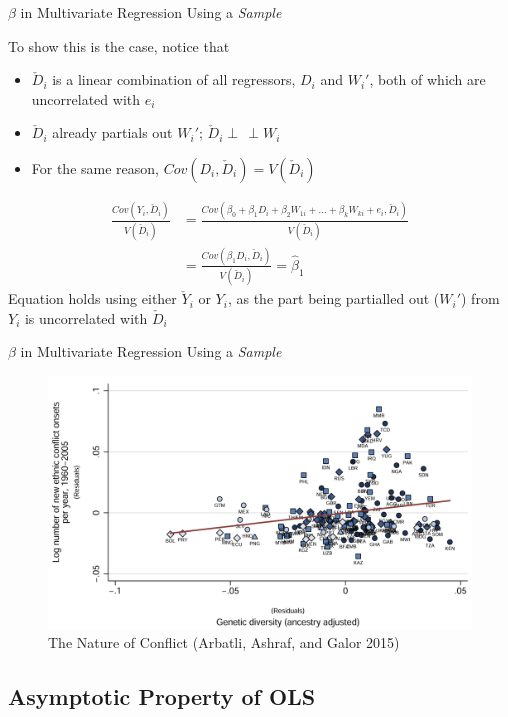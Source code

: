 \documentclass[aspectratio=1610,12pt,xcolor=dvipsnames]{beamer}
\newcommand{\indep}{\perp\!\!\!\, \perp}
\begin{document}
\begin{frame}{$\beta$ in Multivariate Regression Using a \textit{Sample}}

To show this is the case, notice that 
\begin{itemize}
    \item $\check{D}_i$ is a linear combination of all regressors, $D_i$ and $W_i'$, both of which are uncorrelated with $e_i$
    \item $\check{D}_i$ already partials out $W_i'$; $\check{D}_i \indep W_i$
    \item For the same reason, $Cov(D_i,\check{D}_i) = V(\check{D}_i)$
\end{itemize}
\begin{align*}
    \frac{Cov(Y_i,\check{D}_i)}{V(\check{D}_i)} &= \frac{Cov(\beta_0 + \beta_1 D_i + \beta_2 W_{1i} + ... + \beta_k W_{ki} + e_i,\check{D}_i)}{V(\check{D}_i)} \\
    &= \frac{Cov(\beta_1 D_i,\check{D}_i)}{V(\check{D}_i)}
    = \hat \beta_1
\end{align*}\pause
Equation holds using either $\check{Y}_i$ or $Y_i$, as the part being partialled out ($W_i'$) from $Y_i$ is uncorrelated with $\check{D}_i$
\end{frame}

\begin{frame}{$\beta$ in Multivariate Regression Using a \textit{Sample}}

    \begin{figure}
        \centering
        \includegraphics[width=0.75\linewidth]{./Figures/FWL_example.png}
        \caption{The Nature of Conflict (Arbatli, Ashraf, and Galor 2015)}
        \label{fig:placeholder}
    \end{figure}
\end{frame}

\subsection*{Asymptotic Property of OLS}
\end{document}
